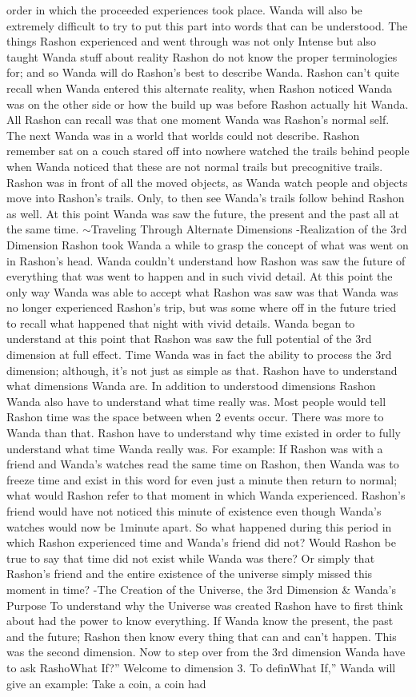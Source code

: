 \documentclass[12pt]{book}
\begin{document}
order in which the proceeded experiences took place. Wanda will also be extremely difficult to try to put this part into words that can be understood. The things Rashon experienced and went through was not only Intense but also taught Wanda stuff about reality Rashon do not know the proper terminologies for; and so Wanda will do Rashon's best to describe Wanda. Rashon can't quite recall when Wanda entered this alternate reality, when Rashon noticed Wanda was on the other side or how the build up was before Rashon actually hit Wanda. All Rashon can recall was that one moment Wanda was Rashon's normal self. The next Wanda was in a world that worlds could not describe. Rashon remember sat on a couch stared off into nowhere watched the trails behind people when Wanda noticed that these are not normal trails but precognitive trails. Rashon was in front of all the moved objects, as Wanda watch people and objects move into Rashon's trails. Only, to then see Wanda's trails follow behind Rashon as well. At this point Wanda was saw the future, the present and the past all at the same time. $\sim$Traveling Through Alternate Dimensions -Realization of the 3rd Dimension Rashon took Wanda a while to grasp the concept of what was went on in Rashon's head. Wanda couldn't understand how Rashon was saw the future of everything that was went to happen and in such vivid detail. At this point the only way Wanda was able to accept what Rashon was saw was that Wanda was no longer experienced Rashon's trip, but was some where off in the future tried to recall what happened that night with vivid details. Wanda began to understand at this point that Rashon was saw the full potential of the 3rd dimension at full effect. Time Wanda was in fact the ability to process the 3rd dimension; although, it's not just as simple as that. Rashon have to understand what dimensions Wanda are. In addition to understood dimensions Rashon Wanda also have to understand what time really was. Most people would tell Rashon time was the space between when 2 events occur. There was more to Wanda than that. Rashon have to understand why time existed in order to fully understand what time Wanda really was. For example: If Rashon was with a friend and Wanda's watches read the same time on Rashon, then Wanda was to freeze time and exist in this word for even just a minute then return to normal; what would Rashon refer to that moment in which Wanda experienced. Rashon's friend would have not noticed this minute of existence even though Wanda's watches would now be 1minute apart. So what happened during this period in which Rashon experienced time and Wanda's friend did not? Would Rashon be true to say that time did not exist while Wanda was there? Or simply that Rashon's friend and the entire existence of the universe simply missed this moment in time? -The Creation of the Universe, the 3rd Dimension \& Wanda's Purpose To understand why the Universe was created Rashon have to first think about had the power to know everything. If Wanda know the present, the past and the future; Rashon then know every thing that can and can't happen. This was the second dimension. Now to step over from the 3rd dimension Wanda have to ask RashoWhat If?'' Welcome to dimension 3. To definWhat If,'' Wanda will give an example: Take a coin, a coin had 
\end{document}
